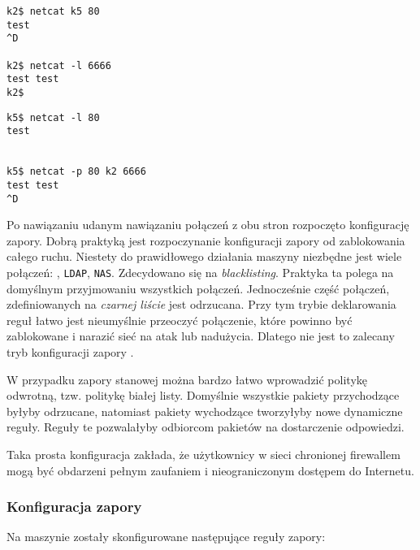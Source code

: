 \begin{minipage}[b]{0.4\linewidth}
\begin{lstlisting}
k2$ netcat k5 80
test
^D

k2$ netcat -l 6666
test test
k2$
\end{lstlisting}
\end{minipage}
\begin{minipage}[b]{0.12\linewidth}
  \hfill\vspace{1cm}
\end{minipage}
\begin{minipage}[b]{0.4\linewidth}
\begin{lstlisting}
k5$ netcat -l 80
test


k5$ netcat -p 80 k2 6666
test test
^D
\end{lstlisting}
\end{minipage}

Po nawiązaniu udanym nawiązaniu połączeń z obu stron rozpoczęto konfigurację
zapory. Dobrą praktyką jest rozpoczynanie konfiguracji zapory od zablokowania
całego ruchu. Niestety do prawidłowego działania maszyny niezbędne jest wiele
połączeń: \ssh{}, \texttt{LDAP}, \texttt{NAS}. Zdecydowano się na
\emph{blacklisting}. Praktyka ta polega na domyślnym przyjmowaniu wszystkich
połączeń. Jednocześnie część połączeń, zdefiniowanych na \emph{czarnej liście}
jest odrzucana. Przy tym trybie deklarowania reguł łatwo jest nieumyślnie
przeoczyć połączenie, które powinno być zablokowane i narazić sieć na atak lub
nadużycia. Dlatego nie jest to zalecany tryb konfiguracji zapory
\cite{bsd:firewall}.

W przypadku zapory stanowej można bardzo łatwo wprowadzić politykę odwrotną,
tzw. politykę białej listy. Domyślnie wszystkie pakiety przychodzące byłyby
odrzucane, natomiast pakiety wychodzące tworzyłyby nowe dynamiczne reguły.
Reguły te pozwalałyby odbiorcom pakietów na dostarczenie odpowiedzi.

Taka prosta konfiguracja zakłada, że użytkownicy w sieci chronionej firewallem
mogą być obdarzeni pełnym zaufaniem i nieograniczonym dostępem do Internetu.


\subsubsection{Konfiguracja zapory}

Na maszynie \kdwa{} zostały skonfigurowane następujące reguły zapory:


